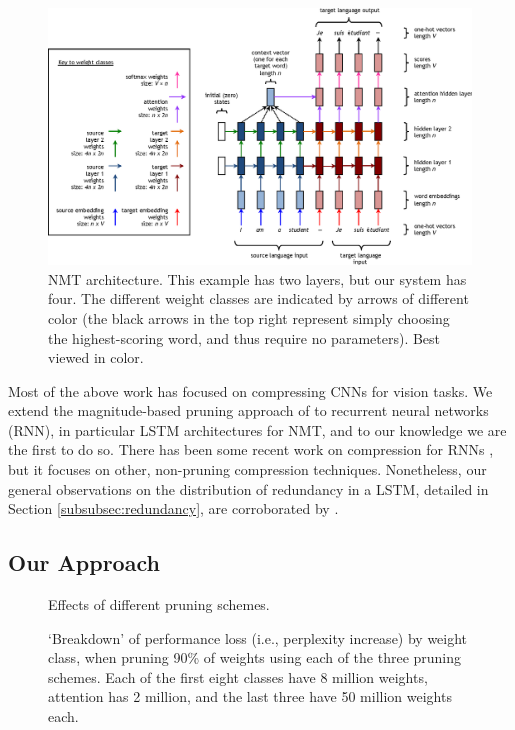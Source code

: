 \begin{figure}[t]
\centering
\includegraphics[width=\textwidth]{img/6-2_nmt_complex} %
\caption{NMT architecture. This example has two layers, but our system has four. The different weight classes are indicated by arrows of different color (the black arrows in the top right represent simply choosing the highest-scoring word, and thus require no parameters).
Best viewed in color.
}
\label{fig:nmt_complex}
\end{figure}


Most of the above work has focused on compressing CNNs for vision tasks. 
We extend the magnitude-based pruning approach of \cite{han2015learning} to recurrent neural networks (RNN), in particular LSTM architectures for NMT, and to our knowledge we are the first to do so.
There has been some recent work on compression for RNNs \cite{lu2016learning,prabhavalkar2016compression}, but it focuses on other, non-pruning compression techniques. 
Nonetheless, our general observations on the distribution of redundancy in a
LSTM, detailed in Section \ref{subsubsec:redundancy}, are corroborated by \cite{lu2016learning}.




\subsection{Our Approach}
\label{subsec:approach}


\begin{figure}
\centering

\caption{Effects of different pruning schemes.}
\label{fig:pruning_methods}
\end{figure}

\begin{figure}
\centering

\caption{`Breakdown' of performance loss (i.e., perplexity increase) by weight class, when pruning 90\% of weights using each of the three pruning schemes. Each of the first eight classes have 8 million weights, attention has 2 million, and the last three have 50 million weights each.}
\label{fig:breakdown}
\end{figure}


